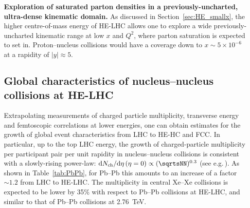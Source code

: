 \documentclass[../report.tex]{subfiles}
\begin{document}
\noindent
{\bf Exploration of saturated parton densities in a previously-uncharted, ultra-dense kinematic domain.}
As discussed in Section~\ref{sec:HE_smallx}, the higher centre-of-mass energy of HE-LHC allows one to explore a wide previously-uncharted kinematic range 
at low $x$ and $Q^2$, where parton saturation is expected to set in.  
Proton--nucleus collisions would have a coverage down  to $x\sim 5\times 10^{-6}$ at a rapidity of $|y|\approx 5$. 


\subsection{Global characteristics of nucleus--nucleus collisions at HE-LHC}
\label{sec:HE_qgpglobal}

Extrapolating measurements of charged particle multiplicity, transverse energy and femtoscopic correlations 
at lower energies, one can obtain estimates
for the growth of global event characteristics from LHC to HE-HC and FCC. In particular, up to the top LHC energy, the growth of charged-particle 
multiplicity per participant pair per unit rapidity in nucleus--nucleus collisions is consistent with a slowly-rising power-law:
   ${\rm d}N_{\rm ch}/{\rm d}\eta\,(\eta=0) \propto (\sqrtsNN)^{0.3}$ (see e.g.\,\cite{Aamodt:2010pb}).
As shown in Table~\ref{tab:PbPb}, for Pb--Pb this amounts to an increase of a factor $\sim 1.2$ from LHC to HE-LHC. 
The multiplicity in central Xe--Xe collisions is expected to be lower by 35\% with respect to Pb--Pb collisions at HE-LHC, and similar to 
that of Pb--Pb collisions at 2.76~TeV.
\end{document}
